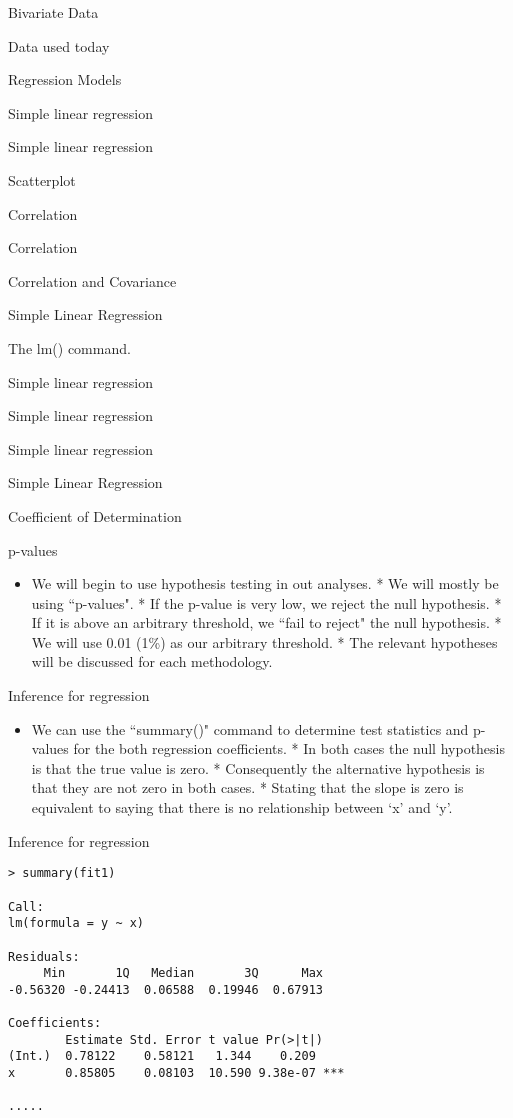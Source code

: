 \begin{slide}{Bivariate Data}
\begin{slide}{Data used today}
\begin{slide}{Regression Models}
\begin{slide}{Simple linear regression}
\begin{slide}{Simple linear regression}
\begin{slide}{Scatterplot}
\begin{slide}{Correlation}
\begin{slide}{Correlation}
\begin{slide}{Correlation and Covariance}
\begin{slide}{Simple Linear Regression}
\begin{slide}{The lm() command.}
\begin{slide}{Simple linear regression}
\begin{slide}{Simple linear regression}
\begin{slide}{Simple linear regression}
\begin{slide}{Simple Linear Regression}
\begin{slide}{Coefficient of Determination}

\begin{slide}{p-values}
\begin{itemize}
\item
We will begin to use hypothesis testing in out analyses.
* We will mostly be using ``p-values".
* If the p-value is very low, we reject the null hypothesis.
* If it is above an arbitrary threshold, we ``fail to reject" the null hypothesis.
* We will use 0.01 (1\%) as our arbitrary threshold.
* The relevant hypotheses will be discussed for each methodology.
\end{itemize}



\begin{slide}{Inference for regression}
\begin{itemize}
\item
We can use the ``summary()" command to determine
test statistics and p-values for the both
regression coefficients.
* In both cases the null hypothesis is that the true value is zero.
* Consequently the alternative hypothesis is that they are not zero in both cases.
* Stating that the slope is zero is equivalent to saying that there is no relationship between `x' and `y'.
\end{itemize}


\begin{slide}{Inference for regression}
\begin{verbatim}
> summary(fit1)

Call:
lm(formula = y ~ x)

Residuals:
     Min       1Q   Median       3Q      Max
-0.56320 -0.24413  0.06588  0.19946  0.67913

Coefficients:
        Estimate Std. Error t value Pr(>|t|)
(Int.)  0.78122    0.58121   1.344    0.209
x       0.85805    0.08103  10.590 9.38e-07 ***

.....

\end{verbatim}



\end{slide}
\end{slide}
\end{slide}
\end{slide}
\end{slide}
\end{slide}
\end{slide}
\end{slide}
\end{slide}
\end{slide}
\end{slide}
\end{slide}
\end{slide}
\end{slide}
\end{slide}
\end{slide}
\end{slide}
\end{slide}
\end{slide}
